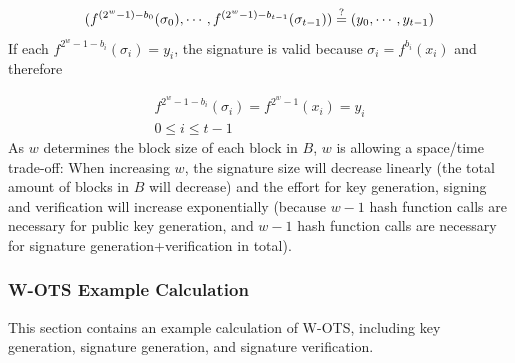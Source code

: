 \begin{equation}
\label{eq:wots_verify}
(f^{(2^w-1)-b_0}(\sigma_0), \cdots, f^{(2^w - 1) - b_{t-1}}(\sigma_{t-1})) \stackrel{?}{=} (y_0, \cdots, y_{t-1})
\end{equation}
If each $f^{2^w-1-b_i}(\sigma_i) = y_i$, the signature is valid because $\sigma_i = f^{b_i}(x_i)$ and therefore

\begin{gather}
f^{2^w-1-b_i}(\sigma_i) = f^{2^w-1}(x_i) = y_i \\
0 \leq i \leq t-1 \nonumber
\end{gather}
As $w$ determines the block size of each block in $B$, $w$ is allowing a space/time trade-off: When increasing $w$, the signature size will decrease linearly (the total amount of blocks in $B$ will decrease) and the effort for key generation, signing and verification will increase exponentially (because $w-1$ hash function calls are necessary for public key generation, and $w-1$ hash function calls are necessary for signature generation+verification in total).

\subsubsection{W-OTS Example Calculation}
\label{sec:w-ots_example_calc}
This section contains an example calculation of W-OTS, including key generation, signature generation, and signature verification.

